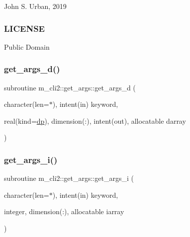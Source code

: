John S. Urban, 2019 \subsubsection*{L\+I\+C\+E\+N\+SE}

Public Domain \mbox{\label{interfacem__cli2_1_1get__args_a4508f384dc3ea5ad71f7e8b5cbdb1f25}} 
\subsubsection{\texorpdfstring{get\+\_\+args\+\_\+d()}{get\_args\_d()}}
{\footnotesize\ttfamily subroutine m\+\_\+cli2\+::get\+\_\+args\+::get\+\_\+args\+\_\+d (\begin{DoxyParamCaption}\item[{character(len=$\ast$), intent(in)}]{keyword,  }\item[{real(kind=\mbox{\hyperlink{namespacem__cli2_acf83f1963cf6a56ad0221cfcf5402440}{dp}}), dimension(\+:), intent(out), allocatable}]{darray }\end{DoxyParamCaption})\hspace{0.3cm}{\ttfamily [private]}}

\mbox{\label{interfacem__cli2_1_1get__args_ab386dff91f7fbb1573208bf6276158f0}} 
\subsubsection{\texorpdfstring{get\+\_\+args\+\_\+i()}{get\_args\_i()}}
{\footnotesize\ttfamily subroutine m\+\_\+cli2\+::get\+\_\+args\+::get\+\_\+args\+\_\+i (\begin{DoxyParamCaption}\item[{character(len=$\ast$), intent(in)}]{keyword,  }\item[{integer, dimension(\+:), allocatable}]{iarray }\end{DoxyParamCaption})\hspace{0.3cm}{\ttfamily [private]}}

